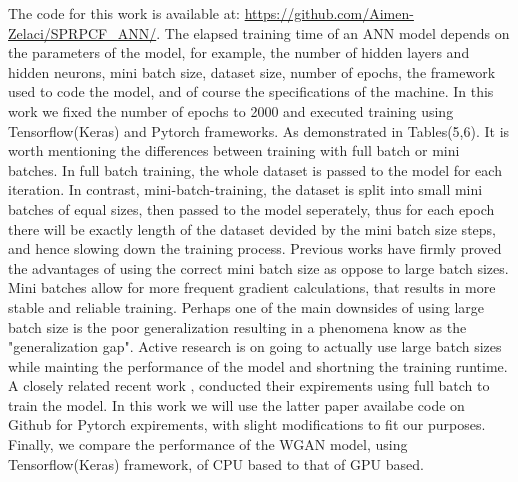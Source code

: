 \documentclass[draft, 10pt]{IEEEtran}
\begin{document}
The code for this work is available at: \url{https://github.com/Aimen-Zelaci/SPRPCF_ANN/}.
\newline
The elapsed training time of an ANN model depends on the parameters of the model, for example, the number of hidden layers and hidden neurons, mini batch size, dataset size, number of epochs, the framework used to code the model, and of course the specifications of the machine.
In this work we fixed the number of epochs to 2000 and executed training using Tensorflow(Keras) and Pytorch frameworks. As demonstrated in Tables(5,6). It is worth mentioning the differences between training with full batch or mini batches. In full batch training, the whole dataset is passed to the model for each iteration. In contrast, mini-batch-training, the dataset is split into small mini batches of equal sizes, then passed to the model seperately, thus for each epoch there will be exactly length  of the dataset devided by the mini batch size steps, and hence slowing down the training process. Previous works \cite{masters2018revisiting, keskar2016large} have firmly proved the advantages of using the correct mini batch size as oppose to large batch sizes. Mini batches allow for more frequent gradient calculations, that results in more stable and reliable training. Perhaps one of the main downsides of using large batch size is the poor generalization resulting in a phenomena know as the "generalization gap". Active research \cite{hoffer2017train} is on going to actually use large batch sizes while mainting the performance of the model and shortning the training runtime. A closely related recent work \cite{paper0}, conducted their expirements using full batch to train the model. In this work we will use the latter paper availabe code on Github for Pytorch expirements, with slight modifications to fit our purposes. Finally, we compare the performance of the WGAN model, using Tensorflow(Keras) framework, of CPU based to that of GPU based.
\end{document}
